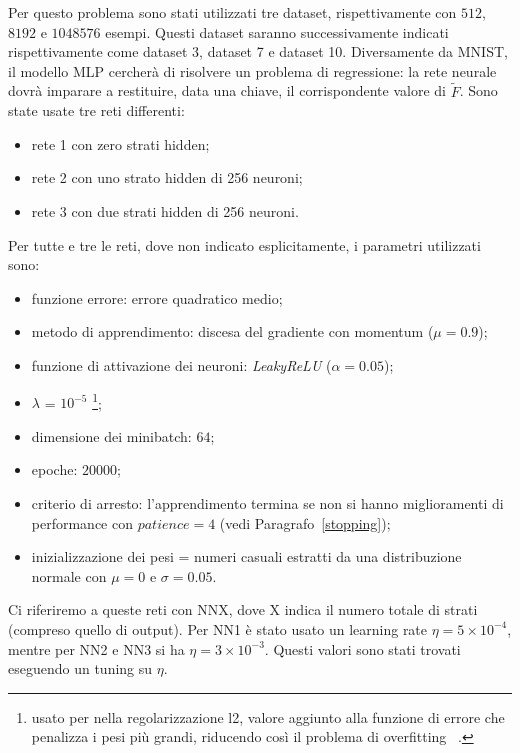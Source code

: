 \documentclass[11pt,a4paper,twoside,
openright]{book}
\begin{document}
Per questo problema sono stati utilizzati tre dataset, rispettivamente con $512$, $8192$ e $1048576$ esempi. Questi dataset saranno successivamente indicati rispettivamente come dataset 3, dataset 7 e dataset 10.
Diversamente da MNIST, il modello MLP cercherà di risolvere un problema di regressione: la rete neurale dovrà imparare a restituire, data una chiave, il corrispondente valore di $\tilde{F}$.
Sono state usate tre reti differenti:
\begin{itemize}
\item{rete 1 con zero strati hidden};
\item{rete 2 con uno strato hidden di 256 neuroni};
\item{rete 3 con due strati hidden di 256 neuroni}.
\end{itemize}
Per tutte e tre le reti, dove non indicato esplicitamente, i parametri utilizzati sono:
\begin{itemize}
\item funzione errore: errore quadratico medio;
\item metodo di apprendimento: discesa del gradiente con momentum ($\mu=0.9$);
\item funzione di attivazione dei neuroni: \textit{LeakyReLU} ($\alpha=0.05$);
\item{$\lambda$} = $10^{-5}$ \footnote{usato per nella regolarizzazione l2, valore aggiunto alla funzione di errore che penalizza i pesi più grandi, riducendo così il problema di overfitting ~\cite{L2}.};
\item{dimensione dei minibatch}: $64$;
\item{epoche}: $20000$;
\item{criterio di arresto}: l'apprendimento termina se non si hanno miglioramenti di performance con $\textit{patience}=4$ (vedi Paragrafo~\ref{stopping});
\item inizializzazione dei pesi = numeri casuali estratti da una distribuzione normale con $\mu=0$ e $\sigma= 0.05$. 
\end{itemize}
Ci riferiremo a queste reti con NNX, dove X indica il numero totale di strati (compreso quello di output).
Per NN1 è stato usato un learning rate $\eta=5 \times 10^{-4}$, mentre per NN2 e NN3 si ha $\eta=3 \times 10^{-3}$. Questi valori sono stati trovati eseguendo un tuning su $\eta$.
\end{document}
